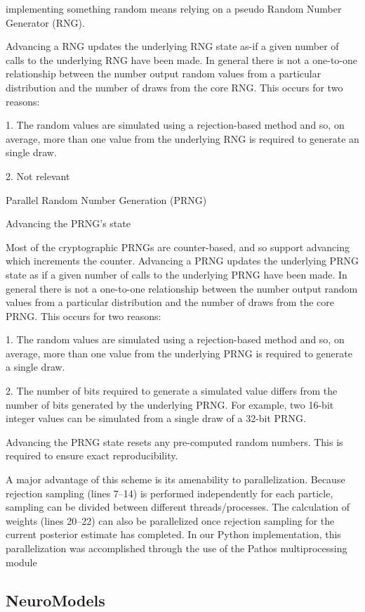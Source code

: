 implementing something random means relying on a pseudo Random Number Generator (RNG).

Advancing a RNG updates the underlying RNG state as-if a given number of calls to the underlying RNG have been made. In general there is not a one-to-one relationship between the number output random values from a particular distribution and the number of draws from the core RNG. This occurs for two reasons:

1. The random values are simulated using a rejection-based method and so, on average, more than one value from the underlying RNG is required to generate an single draw.

2. Not relevant

Parallel Random Number Generation (PRNG) 

Advancing the PRNG’s state

Most of the cryptographic PRNGs are counter-based, and so support advancing which increments the counter. Advancing a PRNG updates the underlying PRNG state as if a given number of calls to the underlying PRNG have been made. In general there is not a one-to-one relationship between the number output random values from a particular distribution and the number of draws from the core PRNG. This occurs for two reasons:

1. The random values are simulated using a rejection-based method and so, on average, more than one value from the underlying PRNG is required to generate a single draw.

2. The number of bits required to generate a simulated value differs from the number of bits generated by the underlying PRNG. For example, two 16-bit integer values can be simulated from a single draw of a 32-bit PRNG.

Advancing the PRNG state resets any pre-computed random numbers. This is required to ensure exact reproducibility.

A major advantage of this scheme is its amenability to parallelization. Because rejection sampling (lines 7–14) is performed independently for each particle, sampling can be divided between different threads/processes. The calculation of weights (lines 20–22) can also be parallelized once rejection sampling for the current posterior estimate has completed. In our Python implementation, this parallelization was accomplished through the use of the Pathos multiprocessing module

\subsection{NeuroModels}

